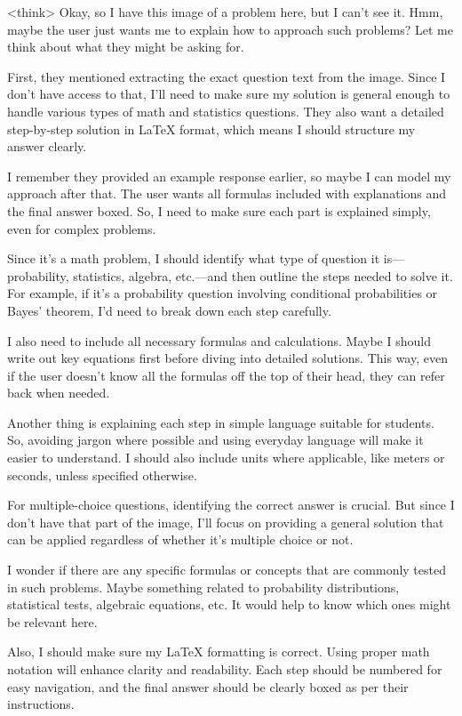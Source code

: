 <think>
Okay, so I have this image of a problem here, but I can't see it. Hmm, maybe the user just wants me to explain how to approach such problems? Let me think about what they might be asking for.

First, they mentioned extracting the exact question text from the image. Since I don't have access to that, I'll need to make sure my solution is general enough to handle various types of math and statistics questions. They also want a detailed step-by-step solution in LaTeX format, which means I should structure my answer clearly.

I remember they provided an example response earlier, so maybe I can model my approach after that. The user wants all formulas included with explanations and the final answer boxed. So, I need to make sure each part is explained simply, even for complex problems.

Since it's a math problem, I should identify what type of question it is—probability, statistics, algebra, etc.—and then outline the steps needed to solve it. For example, if it's a probability question involving conditional probabilities or Bayes' theorem, I'd need to break down each step carefully.

I also need to include all necessary formulas and calculations. Maybe I should write out key equations first before diving into detailed solutions. This way, even if the user doesn't know all the formulas off the top of their head, they can refer back when needed.

Another thing is explaining each step in simple language suitable for students. So, avoiding jargon where possible and using everyday language will make it easier to understand. I should also include units where applicable, like meters or seconds, unless specified otherwise.

For multiple-choice questions, identifying the correct answer is crucial. But since I don't have that part of the image, I'll focus on providing a general solution that can be applied regardless of whether it's multiple choice or not.

I wonder if there are any specific formulas or concepts that are commonly tested in such problems. Maybe something related to probability distributions, statistical tests, algebraic equations, etc. It would help to know which ones might be relevant here.

Also, I should make sure my LaTeX formatting is correct. Using proper math notation will enhance clarity and readability. Each step should be numbered for easy navigation, and the final answer should be clearly boxed as per their instructions.

